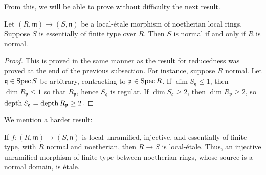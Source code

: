 From this, we will be able to prove without difficulty the next result.
\begin{proposition} \label{normalitypreserved}
Let $(R, \mathfrak{m}) \to (S, \mathfrak{n})$ be a local-\'etale morphism of noetherian local
rings. 
Suppose $S$ is essentially of finite type over $R$.
Then $S$ is normal if and only if $R$ is normal.
\end{proposition} 
\begin{proof} 
This is proved in the same manner as the result for reducedness was proved at
the end of the previous subsection.
For instance, suppose $R$ normal. Let $\mathfrak{q} \in \operatorname{Spec} S$ be arbitrary,
contracting to $\mathfrak{p} \in \operatorname{Spec} R$. If $\dim S_{\mathfrak{q}} \leq 1$,
then $\dim R_{\mathfrak{p}} \leq 1$ so that $R_{\mathfrak{p}}$, hence
$S_{\mathfrak{q}}$ is regular. If $\dim S_{\mathfrak{q}} \geq 2$, then $\dim
R_{\mathfrak{p}} \geq 2$, so 
$\operatorname{depth} S_{\mathfrak{q}} = \operatorname{depth} R_{\mathfrak{p}} \geq 2$.
\end{proof} 

We mention a harder result:

\begin{theorem} 
\label{injunrflat}
If $f:(R, \mathfrak{m}) \to (S, \mathfrak{n})$ is local-unramified, injective,
and essentially of finite type, with $R$ normal and noetherian, then $R \to S$ is
local-\'etale.
Thus, an injective unramified morphism of finite type between noetherian rings,
whose source is a normal domain, is \'etale.
\end{theorem} 

